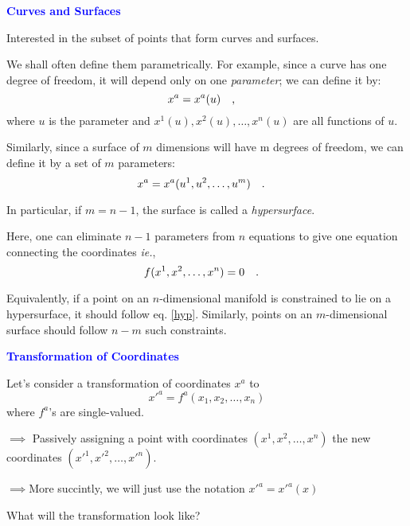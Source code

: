 \documentclass[landscape,aspectratio=169]{slides}
\begin{document}
\begin{slide}	
	\textcolor{blue}{\textbf{Curves and Surfaces}}
	
	Interested in the subset of points that form curves and surfaces.
	
	We shall often define them parametrically. For example, since a curve has one degree of freedom, it will depend only on one \textit{parameter}; we can define it by:
	\begin{equation}\label{key}
	x^a = x^a(u) \qq{,}
	\end{equation}
	where $ u $ is the parameter and $ x^1(u), x^2(u), \ldots, x^n(u) $ are all functions of $ u $.
	
	Similarly, since a surface of $ m $ dimensions will have m degrees of freedom, we can define it by a set of $ m $ parameters:
	\begin{equation}\label{key}
	x^a = x^a(u^1, u^2, \ldots, u^m) \qq{.}
	\end{equation}
\end{slide}	
\begin{slide}
	In particular, if $ m=n-1 $, the surface is called a \textit{hypersurface}. 
	
	Here, one can eliminate $ n-1 $ parameters from $ n $ equations to give one equation connecting the coordinates \textit{ie.},
	\begin{equation}\label{hyp}
	f(x^1, x^2, \ldots, x^n) = 0 \qq{.}
	\end{equation}
	
	Equivalently, if a point on an $ n $-dimensional manifold is constrained to lie on a hypersurface, it should follow eq. \ref{hyp}. Similarly, points on an $ m $-dimensional surface should follow $ n-m $ such constraints.
\end{slide}

\begin{slide}
	\textcolor{blue}{\textbf{Transformation of Coordinates}}
	
	Let's consider a transformation of coordinates $ x^a $ to $$ x'^a =  f^a (x_1, x_2,\ldots, x_n) $$ where $ f^a $'s are single-valued.
	
	$ \implies $ Passively assigning a point with coordinates $ (x^1, x^2,\ldots, x^n) $ the new coordinates $ (x'^1,x'^2, \ldots, x'^n) $. 
	
	$ \implies $More succintly, we will just use the notation $ x'^a = x'^a(x) $
	
	What will the transformation look like?

\end{slide}	
\end{document}
